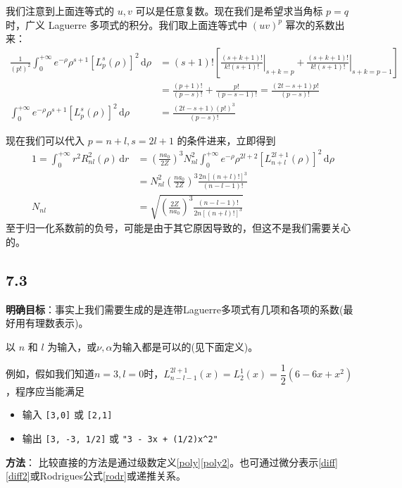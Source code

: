 我们注意到上面连等式的 $u, v$ 可以是任意复数。现在我们是希望求当角标 $p = q$ 时，广义 Laguerre 多项式的积分。我们取上面连等式中 $(uv)^p$ 幂次的系数出来：
\begin{align}
\frac{1}{(p!)^2} \int_0^{+\infty} e^{- \rho} \rho^{s+1} [L_p^s (\rho)]^2 \, \mathrm{d} \rho
&= (s+1)! \left[ \left. \frac{(s+k+1)!}{k!(s+1)!} \right|_{s+k=p} + \left. \frac{(s+k+1)!}{k!(s+1)!} \right|_{s+k=p-1} \right] \\
&= \frac{(p+1)!}{(p-s)!} + \frac{p!}{(p-s-1)!} = \frac{(2t-s+1) p!}{(p-s)!} \\
\int_0^{+\infty} e^{- \rho} \rho^{s+1} [L_p^s (\rho)]^2 \, \mathrm{d} \rho
&= \frac{(2t-s+1) (p!)^3}{(p-s)!}
\end{align}

现在我们可以代入 $p=n+l, s=2l+1$ 的条件进来，立即得到
\begin{align*}
1 = \int_0^{+\infty} r^2 R_{nl}^2 (\rho) \, \mathrm{d} r
&= \left( \frac{n a_0}{2 Z} \right)^3 N_{nl}^2 \int_0^{+\infty} e^{-\rho} \rho^{2 l + 2} [L_{n + l}^{2 l + 1} (\rho)]^2 \, \mathrm{d} \rho \\
&= N_{nl}^2 \left( \frac{n a_0}{2 Z} \right)^3 \frac{2n [(n+l)!]^3}{(n-l-1)!} \\
N_{nl} &= \sqrt{\left( \frac{2 Z}{n a_0} \right)^3 \frac{(n-l-1)!}{2n [(n+l)!]^3}}
\end{align*}
至于归一化系数前的负号，可能是由于其它原因导致的，但这不是我们需要关心的。


\subsection{7.3}

\textbf{明确目标}：事实上我们需要生成的是连带Laguerre多项式有几项和各项的系数(最好用有理数表示)。

以 $n$ 和 $l$ 为输入，或$ \nu,\alpha $为输入都是可以的(见下面定义)。

例如，假如我们知道$n=3,l=0$时，$L_{n-l-1}^{2l+1}(x) = L_2^1(x) = \dfrac{1}{2}(6-6x+x^2) $，程序应当能满足
\begin{itemize}[nosep]
\item 输入 \texttt{[3,0]} 或 \texttt{[2,1]}
\item 输出 \texttt{[3, -3, 1/2]} 或  \texttt{"3 - 3x + (1/2)x\textasciicircum2"}
\end{itemize}
\textbf{方法}：
比较直接的方法是通过级数定义\eqref{poly}\eqref{poly2}。也可通过微分表示\eqref{diff}\eqref{diff2}或Rodrigues公式\eqref{rodr}或递推关系。

